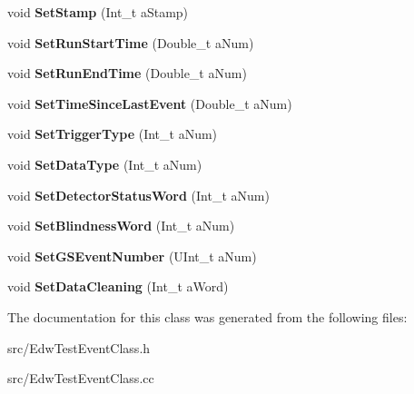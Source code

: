 \begin{DoxyCompactItemize}
\item 
\hypertarget{class_edw_test_event_class_a44913cc1d4b2099152b028a818eaccc6}{
void {\bfseries SetStamp} (Int\_\-t aStamp)}
\label{class_edw_test_event_class_a44913cc1d4b2099152b028a818eaccc6}

\item 
\hypertarget{class_edw_test_event_class_abb00b59067ac4c4e0b831c4e184e7ecf}{
void {\bfseries SetRunStartTime} (Double\_\-t aNum)}
\label{class_edw_test_event_class_abb00b59067ac4c4e0b831c4e184e7ecf}

\item 
\hypertarget{class_edw_test_event_class_a970cc0c59a48e7991131188adc24b276}{
void {\bfseries SetRunEndTime} (Double\_\-t aNum)}
\label{class_edw_test_event_class_a970cc0c59a48e7991131188adc24b276}

\item 
\hypertarget{class_edw_test_event_class_a1935eeca0f623db514a089ef75295dba}{
void {\bfseries SetTimeSinceLastEvent} (Double\_\-t aNum)}
\label{class_edw_test_event_class_a1935eeca0f623db514a089ef75295dba}

\item 
\hypertarget{class_edw_test_event_class_adc286056c8bd061333af167ba114898d}{
void {\bfseries SetTriggerType} (Int\_\-t aNum)}
\label{class_edw_test_event_class_adc286056c8bd061333af167ba114898d}

\item 
\hypertarget{class_edw_test_event_class_ad28ac35357104bba304ca5044092449d}{
void {\bfseries SetDataType} (Int\_\-t aNum)}
\label{class_edw_test_event_class_ad28ac35357104bba304ca5044092449d}

\item 
\hypertarget{class_edw_test_event_class_a302f29cfe3e367aa0262f1ac9f0515ab}{
void {\bfseries SetDetectorStatusWord} (Int\_\-t aNum)}
\label{class_edw_test_event_class_a302f29cfe3e367aa0262f1ac9f0515ab}

\item 
\hypertarget{class_edw_test_event_class_ae318cb86e5de0f120b6c098ea4d28ee4}{
void {\bfseries SetBlindnessWord} (Int\_\-t aNum)}
\label{class_edw_test_event_class_ae318cb86e5de0f120b6c098ea4d28ee4}

\item 
\hypertarget{class_edw_test_event_class_a6ae5178e0bf5a33907429541729c99ba}{
void {\bfseries SetGSEventNumber} (UInt\_\-t aNum)}
\label{class_edw_test_event_class_a6ae5178e0bf5a33907429541729c99ba}

\item 
\hypertarget{class_edw_test_event_class_a059d4707d81190b4948813bede64c8a1}{
void {\bfseries SetDataCleaning} (Int\_\-t aWord)}
\label{class_edw_test_event_class_a059d4707d81190b4948813bede64c8a1}

\end{DoxyCompactItemize}


The documentation for this class was generated from the following files:\begin{DoxyCompactItemize}
\item 
src/EdwTestEventClass.h\item 
src/EdwTestEventClass.cc\end{DoxyCompactItemize}
